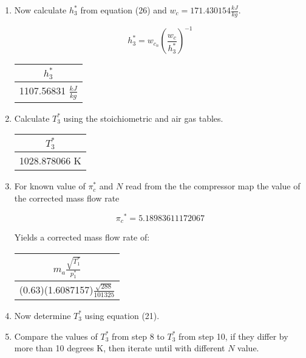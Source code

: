 \documentclass[titlepage]{article}
\begin{document}
\begin{enumerate}
  \item Now calculate $h_{3}^{*}$ from equation (26) and $w_{c} = 171.430154 \frac{kJ}{kg}$.
  
  \begin{equation}
    h_{3}^{*} = w_{c_{n}} \left( \frac{w_{c}}{h_{3}^{*}}\right)^{-1}
  \end{equation}

  \begin{center}
    \begin{tabular}{|c|}
      \hline
      $h_{3}^{*}$ \\
      \hline
      1107.56831 $\frac{kJ}{kg}$ \\
      \hline
    \end{tabular}
  \end{center}

  \item Calculate $T_{3}^{*}$ using the stoichiometric and air gas tables. 
  
  \begin{center}
    \begin{tabular}{|c|}
      \hline
      $T_{3}^{*}$ \\
      \hline
      1028.878066 K \\
      \hline
    \end{tabular}
  \end{center}

  \item For known value of $\pi_{c}^{*}$ and $N$ read from the the compressor map the value of the corrected mass flow rate

  \begin{equation}
    \pi{_c}^{*} = 5.18983611172067
  \end{equation}

  Yields a corrected mass flow rate of:

  \begin{center}
    \begin{tabular}{|c|}
      \hline
      $m_{a}\frac{\sqrt{T_{1}^{*}}}{p_{1}^{*}}$ \\
      \hline
      (0.63)(1.6087157)$\frac{\sqrt{288}}{101325}$ \\
      \hline
    \end{tabular}
  \end{center}

  \item Now determine $T_{3}^{*}$ using equation (21).
  \item Compare the values of $T_{3}^{*}$ from step 8 to $T_{3}^{*}$ from step 10, if they differ by more than 10 degrees K, then iterate until with different $N$ value.
  

\end{enumerate}
\end{document}
